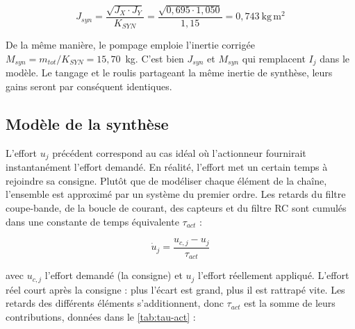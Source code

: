 \begin{equation}
    J_{syn} = \frac{\sqrt{J_X \cdot J_Y}}{K_{SYN}} = \frac{\sqrt{0{,}695 \cdot 1{,}050}}{1{,}15} = 0{,}743\ \mathrm{kg\,m^2}
    \label{eq:jsyn}
\end{equation}

De la même manière, le pompage emploie l'inertie corrigée $M_{syn} = m_{tot}/K_{SYN} = 15{,}70$~kg. C'est bien $J_{syn}$ et $M_{syn}$ qui remplacent $I_j$ dans le modèle. Le tangage et le roulis partageant la même inertie de synthèse, leurs gains seront par conséquent identiques.

\subsection{Modèle de la synthèse}
\label{subsec:ModeleSynthese}
L'effort $u_j$ précédent correspond au cas idéal où l'actionneur fournirait instantanément l'effort demandé. En réalité, l'effort met un certain temps à rejoindre sa consigne. Plutôt que de modéliser chaque élément de la chaîne, l'ensemble est approximé par un système du premier ordre. Les retards du filtre coupe-bande, de la boucle de courant, des capteurs et du filtre RC sont cumulés dans une constante de temps équivalente $\tau_{act}$ :

\begin{equation}
    \dot u_j = \frac{u_{c,j} - u_j}{\tau_{act}}
    \label{eq:actionneur}
\end{equation}

avec $u_{c,j}$ l'effort demandé (la consigne) et $u_j$ l'effort réellement appliqué. L'effort réel court après la consigne : plus l'écart est grand, plus il est rattrapé vite. Les retards des différents éléments s'additionnent, donc $\tau_{act}$ est la somme de leurs contributions, données dans le \autoref{tab:tau-act} :

